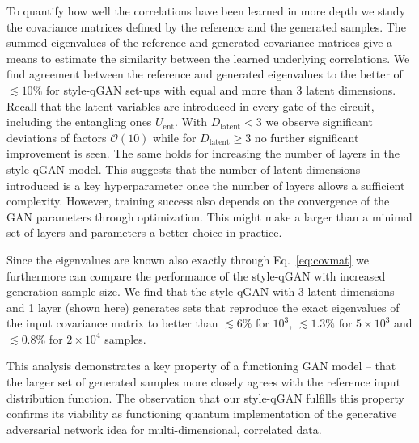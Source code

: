 \documentclass[twocolumn,preprintnumbers,superscriptaddress]{revtex4-2}
\begin{document}
To quantify how well the correlations have been learned in more depth we study the covariance matrices defined by the reference and the generated samples. The summed eigenvalues of the reference and generated covariance matrices give a means to estimate the similarity between the learned underlying correlations. We find agreement between the reference and generated eigenvalues to the better of $\lesssim 10\%$ for style-qGAN set-ups with equal and more than 3 latent dimensions. Recall that the latent variables are introduced in every gate of the circuit, including the entangling ones $U_{\mathrm{ent}}$.  With $D_{\mathrm{latent}}< 3$ we observe significant deviations of factors $\mathcal{O}(10)$ while for $D_{\mathrm{latent}}\geq 3$ no further significant improvement is seen. The same holds for increasing the number of layers in the style-qGAN model. This suggests that the number of latent dimensions introduced is a key hyperparameter once the number of layers allows a sufficient complexity. However, training success also depends on the convergence of the GAN parameters through optimization. This might make a larger than a minimal set of layers and parameters a better choice in practice.

Since the eigenvalues are known also exactly through Eq.~\ref{eq:covmat} we furthermore can compare the performance of the style-qGAN with increased generation sample size. We find that the style-qGAN with 3 latent dimensions and 1 layer (shown here) generates sets that reproduce the exact eigenvalues of the input covariance matrix to better than $\lesssim 6\%$ for $10^3$, $\lesssim 1.3\%$ for $5\times10^3$ and $\lesssim 0.8\%$ for $2\times10^4$ samples.

This analysis demonstrates a key property of a functioning GAN model -- that the larger set of generated samples more closely agrees with the reference input distribution function. The observation that our style-qGAN fulfills this property confirms its viability as functioning quantum implementation of the generative adversarial network idea for multi-dimensional, correlated data.
\end{document}
